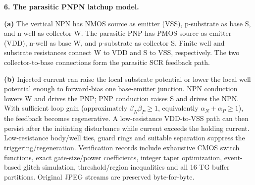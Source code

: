 \documentclass[10pt]{article}
\newcommand{\ground}[2]{\draw (#1,#2)--(#1,{#2-.12});\draw ({#1-.17},{#2-.12})--({#1+.17},{#2-.12});\draw ({#1-.11},{#2-.20})--({#1+.11},{#2-.20});}
\newcommand{\rail}[3]{\draw (#1,#2)--(#1,{#2+.14});\node[above,font=\scriptsize] at (#1,{#2+.14}) {$#3$};}
\begin{document}
\newpage\textbf{6. The parasitic PNPN latchup model.}
\begin{center}\end{center}
\textbf{(a)} The vertical NPN has NMOS source as emitter (VSS), p-substrate as base S, and n-well as collector W. The parasitic PNP has PMOS source as emitter (VDD), n-well as base W, and p-substrate as collector S. Finite well and substrate resistances connect W to VDD and S to VSS, respectively. The two collector-to-base connections form the parasitic SCR feedback path.

\textbf{(b)} Injected current can raise the local substrate potential or lower the local well potential enough to forward-bias one base-emitter junction. NPN conduction lowers W and drives the PNP; PNP conduction raises S and drives the NPN. With sufficient loop gain (approximately $\beta_N\beta_P\geq1$, equivalently $\alpha_N+\alpha_P\geq1$), the feedback becomes regenerative. A low-resistance VDD-to-VSS path can then persist after the initiating disturbance while current exceeds the holding current. Low-resistance body/well ties, guard rings and suitable separation suppress the triggering/regeneration.
\small Verification records include exhaustive CMOS switch functions, exact gate-size/power coefficients, integer taper optimization, event-based glitch simulation, threshold/region inequalities and all 16 TG buffer partitions. Original JPEG streams are preserved byte-for-byte.
\end{document}
